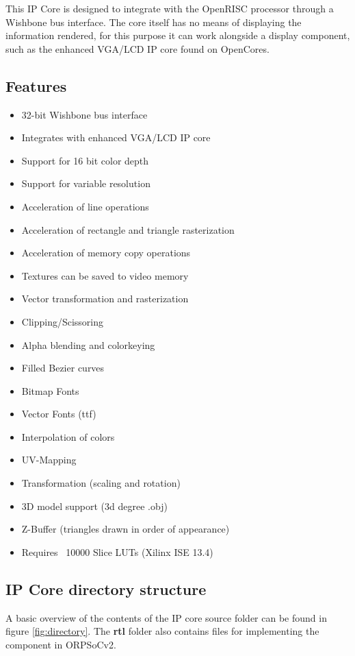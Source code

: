 \documentclass[10pt,a4paper]{article}
\begin{document}
This IP Core is designed to integrate with the OpenRISC processor through a Wishbone bus interface. The core itself has no means of displaying the information rendered, for this purpose it can work alongside a display component, such as the enhanced VGA/LCD IP core found on OpenCores.

\subsection{Features}
\begin{itemize}
\item 32-bit Wishbone bus interface
\item Integrates with enhanced VGA/LCD IP core
\item Support for 16 bit color depth
\item Support for variable resolution
\item Acceleration of line operations
\item Acceleration of rectangle and triangle rasterization
\item Acceleration of memory copy operations
\item Textures can be saved to video memory
\item Vector transformation and rasterization
\item Clipping/Scissoring
\item Alpha blending and colorkeying
\item Filled Bezier curves
\item Bitmap Fonts
\item Vector Fonts (ttf)
\item Interpolation of colors  
\item UV-Mapping
\item Transformation (scaling and rotation)
\item 3D model support (3d degree .obj)
\item Z-Buffer (triangles drawn in order of appearance)
\item Requires ~10000 Slice LUTs (Xilinx ISE 13.4)
\end{itemize}

\subsection{IP Core directory structure}
A basic overview of the contents of the IP core source folder can be found in figure \ref{fig:directory}. The \textbf{rtl} folder also contains files for implementing the component in ORPSoCv2.
\end{document}
